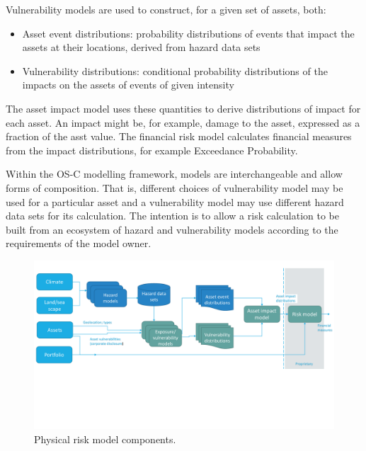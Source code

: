 \documentclass[a4paper,11pt]{extarticle} %
\begin{document}
Vulnerability models are used to construct, for a given set of assets, both:
\begin{itemize}
    \item Asset event distributions: probability distributions of events that impact the assets at their locations, derived from hazard data sets
    \item Vulnerability distributions: conditional probability distributions of the impacts on the assets of events of given intensity
\end{itemize}

The asset impact model uses these quantities to derive distributions of impact for each asset. An impact might be, for example, damage to the asset, expressed as a fraction of the asst value. The financial risk model calculates financial measures from the impact distributions, for example Exceedance Probability.

Within the OS-C modelling framework, models are interchangeable and allow forms of composition. That is, different choices of vulnerability model may be used for a particular asset and a vulnerability model may use different hazard data sets for its calculation. The intention is to allow a risk calculation to be built from an ecosystem of hazard and vulnerability models according to the requirements of the model owner.

\begin{figure}[ht]

    \begin{framed}
        \includegraphics[clip, trim=0cm 7cm 0cm 1cm, width=1.00\textwidth]{plots/top_level_view.pdf}

    \end{framed}

    \footnotesize

    \renewcommand{\arraystretch}{1.01}

    \vspace{-3ex}

    \vspace{-0.5ex}

    \caption{\small Physical risk model components. }
    \label{Fig:top_level_view}

\end{figure}
\end{document}
